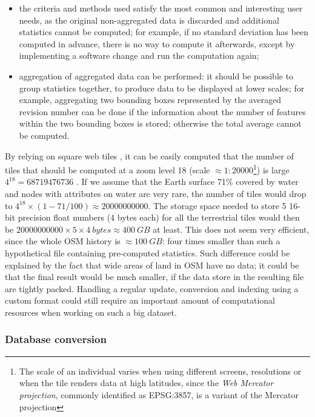 \documentclass{Configuration_Files/PoliMi3i_thesis}
\begin{document}
\begin{itemize}
\item the criteria and methods used satisfy the most common and interesting user needs, as the original non-aggregated data is discarded and additional statistics cannot be computed; for example, if no standard deviation has been computed in advance, there is no way to compute it afterwards, except by implementing a software change and run the computation again;
\item aggregation of aggregated data can be performed: it should be possible to group statistics together, to produce data to be displayed at lower scales; for example, aggregating two bounding boxes represented by the averaged revision number can be done if the information about the number of features within the two bounding boxes is stored; otherwise the total average cannot be computed.
\end{itemize}

By relying on square web tiles \cite{TiledWebMap2022}, it can be easily computed that the number of tiles that should be computed at a zoom level 18 (scale $ \approx 1 : 20 000 $\footnote{The scale of an individual varies when using different screens, resolutions or when the tile renders data at high latitudes, since the \textit{Web Mercator projection}, commonly identified as EPSG:3857, is a variant of the Mercator projection}) is large $ 4^{18} = 68 719 476 736 $ \cite{ZoomLevelsOpenStreetMap}. If we assume that the Earth surface 71\% covered by water and nodes with attributes on water are very rare, the number of tiles would drop to $ 4^{18} \times (1-71/100) \approx 20 000 000 000 $. The storage space needed to store 5 16-bit precision float numbers (4 bytes each) for all the terrestrial tiles would then be $ 20 000 000 000 \times 5 \times \SI{4}{bytes} \approx\SI{400}{GB} $ at least. This does not seem very efficient, since the whole OSM history is $ \approx\SI{100}{GB} $: four times smaller than such a hypothetical file containing pre-computed statistics. Such difference could be explained by the fact that wide areas of land in OSM have no data; it could be that the final result would be much smaller, if the data store in the resulting file are tightly packed.
Handling a regular update, conversion and indexing using a custom format could still require an important amount of computational resources when working on such a big dataset.

\subsubsection{Database conversion}
\end{document}
